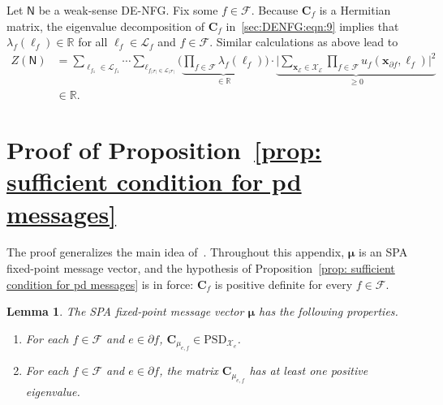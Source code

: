 \documentclass[journal]{IEEEtran}
\newcommand{\add}[1]{{\color{black}#1}}
\newtheorem{lemma}[theorem]{Lemma}
\newcommand{\vect}[1]{ \bm{#1} }
\newcommand{\set}[1]{\mathcal{#1}}
\newcommand{\setEfull}{ \mathcal{E} }
\newcommand{\setF}{ \mathcal{F} }
\newcommand{\setpf}{ \partial f }
\newcommand{\sR}{\mathbb{R}}
\newcommand{\setxe}{ \mathcal{X}_{e} }
\newcommand{\setx}{ \mathcal{X} }
\newcommand{\vx}{ \vect{x} }
\newcommand{\vmu}{ \vect{ \mu } }
\newcommand{\graphN}{ \mathsf{N} }
\newcommand{\setPSD}[1]{ \mathrm{PSD}_{#1} }
\newcommand{\matr}[1]{\vect{#1}}
\begin{document}
\begin{appendices}
  Let $\graphN$ be a weak-sense DE-NFG. Fix some $f \in \setF$. Because
  $\matr{C}_f$ is a Hermitian matrix, the eigenvalue decomposition of $ \matr{C}_f  $ in~\eqref{sec:DENFG:eqn:9} implies that $ \lambda_{f}(\ell_f) \in \sR $ for all $ \ell_f \in \set{L}_f $ and $ f \in \set{F} $.
  Similar calculations as above lead to
  \begin{align*}
    Z(\graphN)
     & = \!\!\!\! \sum_{\ell_{f_1} \in \set{L}_{f_1}}
    \!\!\!\!\cdots\!\!\!\!
    \sum_{\ell_{f_{|\setF|} \in \set{L}_{|\setF|}}}
    \!\!\!\!
    \Biggl(
    \underbrace{
      \prod_{f \in \setF}
      \lambda_{f}(\ell_f)
    }_{\in \sR}
    \Biggr) \!\! \cdot \!\!
    \underbrace{
      \Biggl|
      \sum_{ \vx_{\setEfull} \in \setx_{\setEfull} }
      \prod_{f \in \setF} u_{f}(\vx_{\setpf},\ell_f)
      \Biggr|^{2}
    }_{\geq 0}
    \\&\in \sR.
  \end{align*}

  \section{Proof of Proposition~\ref{prop: sufficient condition for pd messages}}
  \label{apx: sufficient condition for pd messages}
  The proof generalizes the main idea of~\cite[Proposition 4]{Yedidia2005}. Throughout this appendix, $ \vmu $ is an SPA fixed-point message vector, and the hypothesis of Proposition~\ref{prop: sufficient condition for pd messages} is in force: $\matr{C}_f$ is positive definite for every $f\in\setF$.

  \begin{lemma}
    \label{lem: property of mu}
    The SPA fixed-point message vector $ \vmu $
    has the following properties.
    \begin{enumerate}
      \item \add{For each $ f \in \setF $ and $ e \in \setpf $,}
            $ \matr{C}_{\mu_{e,f}} \in \setPSD{\setxe} $.

      \item For each $ f \in \setF $ and $ e \in \setpf $, the matrix $\mathbf{C}_{\mu_{e,f}}$ has at least one positive eigenvalue.


\end{enumerate}
\end{lemma}
\end{appendices}
\end{document}
